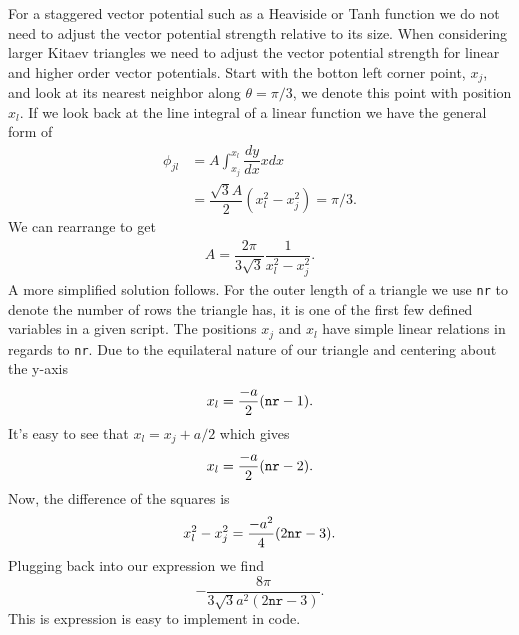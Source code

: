 For a staggered vector potential such as a Heaviside or Tanh function we do not need to adjust the vector potential strength relative to its size.
When considering larger Kitaev triangles we need to adjust the vector potential strength for linear and higher order vector potentials.
Start with the botton left corner point, $x_j$, and look at its nearest neighbor along $\theta=\pi/3$, we denote this point with position $x_l$.
If we look back at the line integral of a linear function we have the general form of
\begin{align}
  \phi_{jl} &= A \int_{x_j}^{x_l} \dfrac{dy}{dx} x dx \nonumber \\
  &= \dfrac{\sqrt{3} A}{2} (x_l^2 - x_j^2) = \pi/3. \nonumber
\end{align}
We can rearrange to get
\begin{align}
  A = \dfrac{2 \pi}{3 \sqrt{3}} \dfrac{1}{x_l^2 - x_j^2}.
\end{align}
A more simplified solution follows.
For the outer length of a triangle we use \verb|nr| to denote the number of rows the triangle has, it is one of the first few defined variables in a given script.
The positions $x_j$ and $x_l$ have simple linear relations in regards to \verb|nr|.
Due to the equilateral nature of our triangle and centering about the y-axis
\begin{equation}
  x_l = \dfrac{-a}{2} (\verb|nr| - 1).
\end{equation}
It's easy to see that $x_l = x_j + a/2$ which gives
\begin{equation}
  x_l = \dfrac{-a}{2} (\verb|nr| - 2).
\end{equation}
Now, the difference of the squares is
\begin{equation}
  x_l^2 - x_j^2 = \dfrac{-a^2}{4} (2 \verb|nr| - 3).
\end{equation}
Plugging back into our expression we find
\begin{equation}
  -\dfrac{8 \pi}{3 \sqrt{3} a^2 (2 \texttt{nr}- 3)}.
\end{equation}
This is expression is easy to implement in code.
